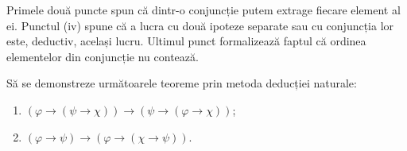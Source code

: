 Primele două puncte spun că dintr-o conjuncție putem extrage fiecare element al ei. Punctul (iv)
spune că a lucra cu două ipoteze separate sau cu conjuncția lor este, deductiv, același lucru. Ultimul punct formalizează faptul că ordinea elementelor din conjuncție nu contează.

\begin{ex}
Să se demonstreze următoarele teoreme prin metoda deducției naturale:
\begin{enumerate}
    \item[(i)] $(\varphi \rightarrow (\psi \rightarrow \chi)) \rightarrow (\psi \rightarrow (\varphi \rightarrow \chi))$;
    \item[(ii)] $(\varphi \rightarrow \psi) \rightarrow (\varphi \rightarrow (\chi \rightarrow \psi))$.
\end{enumerate}
\end{ex}

